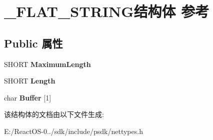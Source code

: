 \hypertarget{struct___f_l_a_t___s_t_r_i_n_g}{}\section{\+\_\+\+F\+L\+A\+T\+\_\+\+S\+T\+R\+I\+N\+G结构体 参考}
\label{struct___f_l_a_t___s_t_r_i_n_g}
\subsection*{Public 属性}
\begin{DoxyCompactItemize}
\item 
\mbox{\label{struct___f_l_a_t___s_t_r_i_n_g_a073e38a656bd4c54ee5200b6a8218fd0}} 
S\+H\+O\+RT {\bfseries Maximum\+Length}
\item 
\mbox{\label{struct___f_l_a_t___s_t_r_i_n_g_af2831924437d7dcd6f82d0c6b8af2f5f}} 
S\+H\+O\+RT {\bfseries Length}
\item 
\mbox{\label{struct___f_l_a_t___s_t_r_i_n_g_a06f7226847421013e3d111ce8183e61f}} 
char {\bfseries Buffer} \mbox{[}1\mbox{]}
\end{DoxyCompactItemize}


该结构体的文档由以下文件生成\+:\begin{DoxyCompactItemize}
\item 
E\+:/\+React\+O\+S-\/0../sdk/include/psdk/nettypes.\+h\end{DoxyCompactItemize}
